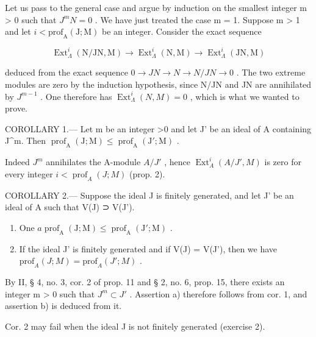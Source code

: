 Let us pass to the general case and argue by induction on the smallest integer m \textgreater{} 0 such that \(J^{m}N = 0\) . We have just treated the case m = 1. Suppose m \textgreater{} 1 and let \(i < \text{prof}_{\text{A}}(\text{J}; \text{M})\) be an integer. Consider the exact sequence

\[
\operatorname{Ext} _ {\Lambda} ^ {i} (\mathrm{N/JN,M}) \longrightarrow \operatorname{Ext} _ {\Lambda} ^ {i} (\mathrm{N,M}) \longrightarrow \operatorname{Ext} _ {\Lambda} ^ {i} (\mathrm{JN,M})
\]

deduced from the exact sequence \(0 \rightarrow JN \rightarrow N \rightarrow N/JN \rightarrow 0\) . The two extreme modules are zero by the induction hypothesis, since N/JN and JN are annihilated by \(J^{m-1}\) . One therefore has \(\operatorname{Ext}_{\Lambda}^{i}(N,M) = 0\) , which is what we wanted to prove.

COROLLARY 1.--- Let m be an integer \textgreater0 and let J' be an ideal of A containing J\^{}m. Then \(\operatorname{prof}_{\mathrm{A}}(\mathrm{J};\mathrm{M}) \leqslant \operatorname{prof}_{\mathrm{A}}(\mathrm{J}';\mathrm{M})\) .

Indeed \(J^{m}\) annihilates the A-module \(A/J'\) , hence \(\operatorname{Ext}_{A}^{i}(A/J', M)\) is zero for every integer \(i < \operatorname{prof}_{A}(J; M)\) (prop. 2).

COROLLARY 2.--- Suppose the ideal J is finitely generated, and let J' be an ideal of A such that V(J) ⊃ V(J').

\begin{enumerate}
\def\labelenumi{\alph{enumi})}
\item
  One \(a \operatorname{prof}_{\mathrm{A}}(\mathrm{J}; \mathrm{M}) \leqslant \operatorname{prof}_{\mathrm{A}}(\mathrm{J}'; \mathrm{M})\) .
\item
  If the ideal J' is finitely generated and if V(J) = V(J'), then we have \(\text{prof}_{A}(J; M) = \text{prof}_{A}(J'; M)\) .
\end{enumerate}

By II, § 4, no. 3, cor. 2 of prop. 11 and § 2, no. 6, prop. 15, there exists an integer m \textgreater{} 0 such that \(J^{m} \subset J'\) . Assertion a) therefore follows from cor. 1, and assertion b) is deduced from it.

Cor. 2 may fail when the ideal J is not finitely generated (exercise 2).


